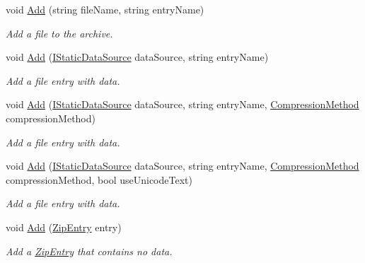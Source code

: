 \begin{DoxyCompactItemize}
void \hyperlink{class_i_c_sharp_code_1_1_sharp_zip_lib_1_1_zip_1_1_zip_file_a4d313fdf4e6a95365878531ddb876bec}{Add} (string file\+Name, string entry\+Name)
\begin{DoxyCompactList}\small\item\em Add a file to the archive. \end{DoxyCompactList}\item 
void \hyperlink{class_i_c_sharp_code_1_1_sharp_zip_lib_1_1_zip_1_1_zip_file_a9fbaf6bf4b9b79890ef7b85f3378fa35}{Add} (\hyperlink{interface_i_c_sharp_code_1_1_sharp_zip_lib_1_1_zip_1_1_i_static_data_source}{I\+Static\+Data\+Source} data\+Source, string entry\+Name)
\begin{DoxyCompactList}\small\item\em Add a file entry with data. \end{DoxyCompactList}\item 
void \hyperlink{class_i_c_sharp_code_1_1_sharp_zip_lib_1_1_zip_1_1_zip_file_ac1c5a6fbf07f3e830e8951e7e493460d}{Add} (\hyperlink{interface_i_c_sharp_code_1_1_sharp_zip_lib_1_1_zip_1_1_i_static_data_source}{I\+Static\+Data\+Source} data\+Source, string entry\+Name, \hyperlink{namespace_i_c_sharp_code_1_1_sharp_zip_lib_1_1_zip_a90a0e174eca72bf6b490bae40d83a09e}{Compression\+Method} compression\+Method)
\begin{DoxyCompactList}\small\item\em Add a file entry with data. \end{DoxyCompactList}\item 
void \hyperlink{class_i_c_sharp_code_1_1_sharp_zip_lib_1_1_zip_1_1_zip_file_a331b7f4555c4225f36956c6c0ceac4c1}{Add} (\hyperlink{interface_i_c_sharp_code_1_1_sharp_zip_lib_1_1_zip_1_1_i_static_data_source}{I\+Static\+Data\+Source} data\+Source, string entry\+Name, \hyperlink{namespace_i_c_sharp_code_1_1_sharp_zip_lib_1_1_zip_a90a0e174eca72bf6b490bae40d83a09e}{Compression\+Method} compression\+Method, bool use\+Unicode\+Text)
\begin{DoxyCompactList}\small\item\em Add a file entry with data. \end{DoxyCompactList}\item 
void \hyperlink{class_i_c_sharp_code_1_1_sharp_zip_lib_1_1_zip_1_1_zip_file_ab4eeae2aa7e8738707415c7e3b72877f}{Add} (\hyperlink{class_i_c_sharp_code_1_1_sharp_zip_lib_1_1_zip_1_1_zip_entry}{Zip\+Entry} entry)
\begin{DoxyCompactList}\small\item\em Add a \hyperlink{class_i_c_sharp_code_1_1_sharp_zip_lib_1_1_zip_1_1_zip_entry}{Zip\+Entry} that contains no data. \end{DoxyCompactList}\item 

\end{DoxyCompactItemize}
